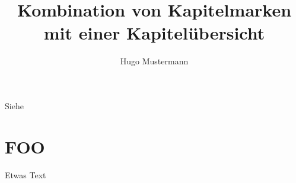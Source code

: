 \documentclass{dtk2}
\author{Hugo Mustermann}
\begin{document}
\title{Kombination von Kapitelmarken mit einer Kapitelübersicht}

\maketitle
\nocite{*}
Siehe~\cite{knuth:ct:a}

\section{FOO}

Etwas Text \clearpage

\printbibliography
\end{document}
